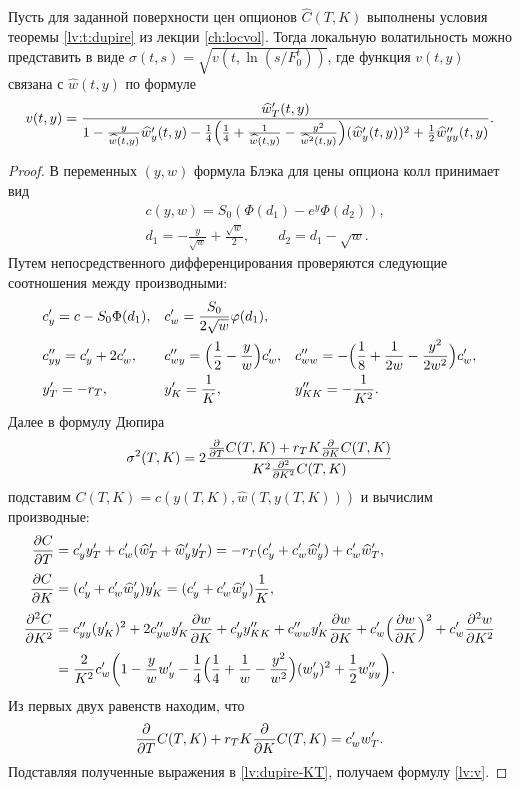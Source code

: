 \begin{proposition}
Пусть для заданной поверхности цен опционов $\hat C(T,K)$ выполнены условия теоремы \ref{lv:t:dupire} из лекции \ref{ch:locvol}.
Тогда локальную волатильность можно представить в виде $\sigma(t,s) = \sqrt{v(t, \ln(s/F_0^t))}$, где функция $v(t,y)$ связана с $\hat w(t,y)$ по формуле
\begin{equation}
\label{lv:v}
v(t,y) = \frac{\hat w'_T(t,y)}{1 - \frac{y}{\hat w(t,y)} \hat w'_y(t,y) - \frac14\Bigl(\frac14 + \frac1{\hat w(t,y)} - \frac{y^2}{\hat w^2(t,y)}\Bigr)(\hat w'_y(t,y))^2 + \frac12 \hat w''_{yy}(t,y)}.
\end{equation}
\end{proposition}

\begin{proof}
В переменных $(y,w)$ формула Блэка для цены опциона колл принимает вид
\begin{align*}
&c(y, w) = S_0(\Phi(d_1) - e^y \Phi(d_2)),\\
&d_1 = -\frac{y}{\sqrt w}  + \frac{\sqrt{w}}{2}, \qquad d_2 = d_1 - \sqrt w.
\end{align*}
Путем непосредственного дифференцирования проверяются следующие соотношения между производными:
\begin{align*}
&c'_y = c - S_0\Phi(d_1),& &c'_w = \frac{S_0}{2\sqrt w}\phi(d_1),& &\\
&c''_{yy} = c'_y + 2c'_w,& &c''_{wy}= \Bigl(\frac12 - \frac yw\Bigr)c'_w,& 
&c''_{ww} = -\Bigl(\frac18 + \frac1{2w} - \frac{y^2}{2w^2}\Bigr) c'_w,\\
&y'_T = -r_T,& &y'_K = \frac1K,& &y''_{KK} = -\frac1{K^2}.
\end{align*}
Далее в формулу Дюпира
\begin{equation}
\label{lv:dupire-KT}  
\sigma^2(T,K) = 2\frac{\prt{}T C(T,K) + r_TK\prt{}KC(T,K)}{K^2\prtt{}K C(T,K)}
\end{equation}
подставим $C(T,K) = c(y(T,K), \hat w(T, y(T,K)))$ и вычислим производные:
\begin{align*}
\prt CT &=  c'_y y'_T + c'_w(\hat w'_T + \hat w'_y y'_T) = -r_T (c'_y + c'_w \hat w'_y) + c'_w \hat w'_T,\\[0.3em]
\prt CK &= (c'_y + c'_w\hat w'_y) y'_K = (c'_y + c'_w\hat w'_y) \frac1K,\\[0.3em]
\prtt CK &= c''_{yy}(y'_K)^2 + 2 c''_{yw} y'_K \prt wK + c'_y y''_{KK} + c''_{ww}y'_K\prt wK + c'_w \Bigl(\prt wK\Bigr)^2 + c'_w \prtt wK\\[0.3em]
&= \frac2{K^2} c'_w\biggl(1 - \frac yw w'_y -\frac14\Bigl(\frac14 + \frac1w - \frac{y^2}{w^2}\Bigr)(w'_y)^2 + \frac12 w''_{yy}\biggr).
\end{align*}
Из первых двух равенств находим, что
\[
\prt{}T C(T,K) + r_TK\prt{}KC(T,K) = c'_w w'_T.
\]
Подставляя полученные выражения в \eqref{lv:dupire-KT}, получаем формулу \eqref{lv:v}.
\end{proof}





